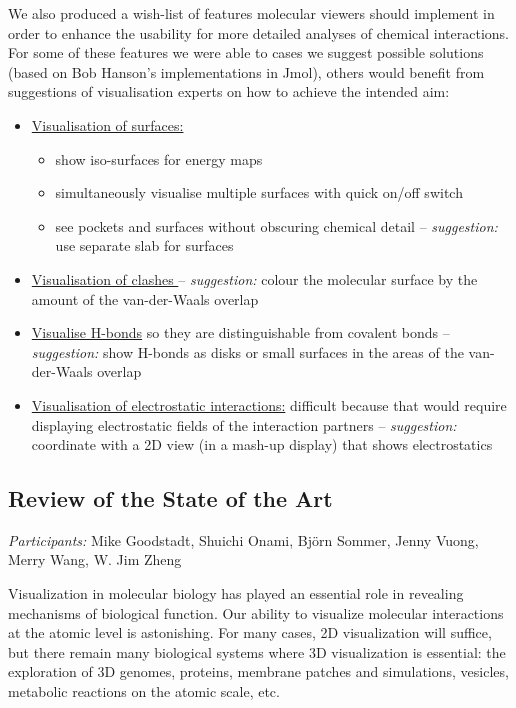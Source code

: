 \documentclass[a4paper]{article}
\begin{document}
We also produced a wish-list of features molecular viewers should implement in order to enhance the usability for more detailed analyses of chemical interactions. For some of these features we were able to cases we suggest possible solutions (based on Bob Hanson's implementations in Jmol), others would benefit from suggestions of visualisation experts on how to achieve the intended aim: 
\begin{itemize}
\item \underline{Visualisation of surfaces:}
	\begin{itemize}
	\item  show iso-surfaces for energy maps
	\item  simultaneously visualise multiple surfaces with quick on/off switch 
	\item  see pockets and surfaces without obscuring chemical detail -- \emph{suggestion:} use separate slab for surfaces 
	\end{itemize}
\item  \underline{Visualisation of clashes }--  \emph{suggestion:} colour the molecular surface by the amount of the van-der-Waals overlap
\item  \underline{Visualise H-bonds} so they are distinguishable from covalent bonds -- \emph{suggestion:} show H-bonds as disks or small surfaces in the areas of the van-der-Waals overlap
\item  \underline{Visualisation of electrostatic interactions:} difficult because that would require displaying electrostatic fields of the interaction partners -- \emph{suggestion:} coordinate with a 2D view (in a mash-up display) that shows electrostatics
\end{itemize}

\subsection{Review of the State of the Art}

\emph{Participants:} 
Mike Goodstadt, Shuichi Onami, Bj\"{o}rn Sommer, Jenny Vuong, Merry Wang, W. Jim Zheng
\medskip

Visualization in molecular biology has played an essential role in revealing mechanisms of biological function. Our ability to visualize molecular interactions at the atomic level is astonishing. For many cases, 2D visualization will suffice, but there remain many biological systems where 3D visualization is essential: the exploration of 3D genomes, proteins, membrane patches and simulations, vesicles, metabolic reactions on the atomic scale, etc.
\end{document}
